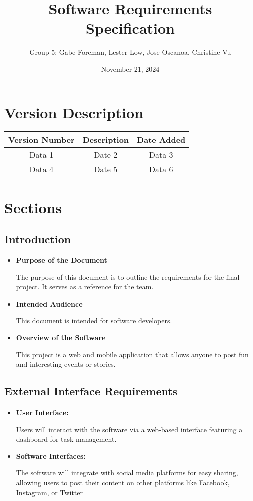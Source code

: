 \documentclass{article}
\title{Software Requirements Specification}
\author{Group 5: Gabe Foreman, Lester Low, Jose Oscanoa, Christine Vu}
\date{November 21, 2024}
\begin{document}
\maketitle
\tableofcontents
\newpage

\section{Version Description}
\begin{table}[h!]
    \centering
    \begin{tabular}{c|c|c}
    \hline
    Version Number & Description & Date Added \\ \hline
    Data 1 & Date 2 & Data 3 \\ \hline
    Data 4 & Date 5 & Data 6 \\ \hline
    \end{tabular}
    \label{tab:my_label}
\end{table}

\section{Sections}
\subsection{Introduction}
\begin{itemize}
    \item \textbf{Purpose of the Document}         
            
            The purpose of this document is to outline the requirements for the final project. It serves as a reference for the team.
            
    \item \textbf{Intended Audience} 
            
            This document is intended for software developers.
            
    \item \textbf{Overview of the Software}
            
            This project is a web and mobile application that allows anyone to post fun and interesting events or stories.

\end{itemize}

\subsection{External Interface Requirements}
\begin{itemize}
    \item \textbf{User Interface:}

            Users will interact with the software via a web-based interface featuring a dashboard for task management.

    \item \textbf{Software Interfaces:}
 
            The software will integrate with social media platforms for easy sharing, allowing users to post their content on other platforms like Facebook, Instagram, or Twitter

\end{itemize}
\end{document}
